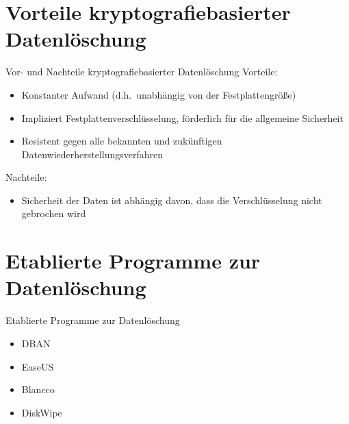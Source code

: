 \documentclass[aspectratio=169]{beamer}
\begin{document}
\section{Vorteile kryptografiebasierter Datenlöschung}
\begin{frame}{Vor- und Nachteile kryptografiebasierter Datenlöschung}
	\large{Vorteile:}
	\begin{itemize}
		\item Konstanter Aufwand (d.h.\ unabhängig von der Festplattengröße)
		\item Impliziert Festplattenverschlüsselung, förderlich für die
			allgemeine Sicherheit
		\item Resistent gegen alle bekannten und zukünftigen
			Datenwiederherstellungsverfahren
	\end{itemize}

	\large{Nachteile:}
	
	\begin{itemize}
		\item Sicherheit der Daten ist abhängig davon, dass die Verschlüsselung
			nicht gebrochen wird
	\end{itemize}
\end{frame}

\section{Etablierte Programme zur Datenlöschung}
\begin{frame}{Etablierte Programme zur Datenlöschung}
	\begin{itemize}
		\item DBAN
		\item EaseUS
		\item Blancco
		\item DiskWipe
	\end{itemize}
\end{frame}
\end{document}
